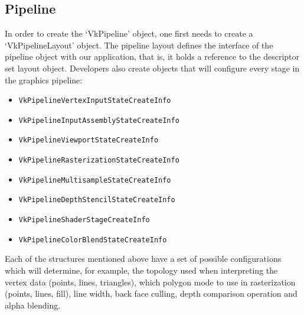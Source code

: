 \subsection{Pipeline}
In order to create the `VkPipeline' object, one first needs to create a `VkPipelineLayout' object. The pipeline layout defines the interface of the pipeline object with our application, that is, it holds a reference to the descriptor set layout object. Developers also create objects that will configure every stage in the graphics pipeline:

\begin{itemize}
    \item \texttt{VkPipelineVertexInputStateCreateInfo}
    \item \texttt{VkPipelineInputAssemblyStateCreateInfo}
    \item \texttt{VkPipelineViewportStateCreateInfo}
    \item \texttt{VkPipelineRasterizationStateCreateInfo}
    \item \texttt{VkPipelineMultisampleStateCreateInfo}
    \item \texttt{VkPipelineDepthStencilStateCreateInfo}
    \item \texttt{VkPipelineShaderStageCreateInfo}
    \item \texttt{VkPipelineColorBlendStateCreateInfo}
\end{itemize}

Each of the structures mentioned above have a set of possible configurations which will determine, for example, the topology used when interpreting the vertex data (points, lines, triangles), which polygon mode to use in rasterization (points, lines, fill), line width, back face culling, depth comparison operation and alpha blending.
